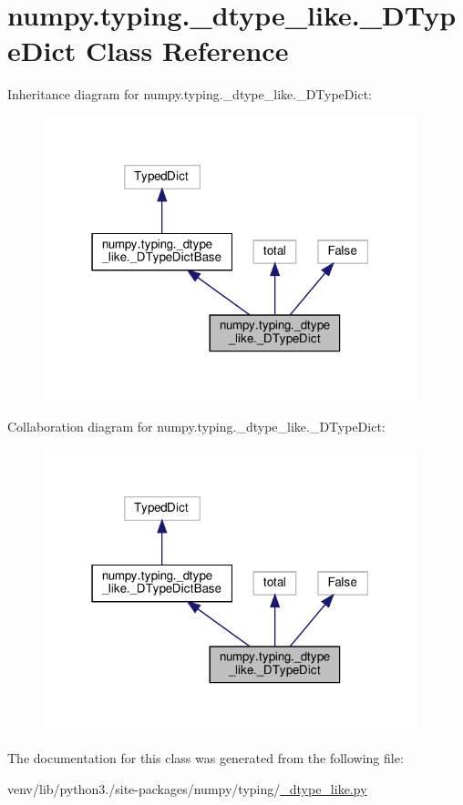 \hypertarget{classnumpy_1_1typing_1_1__dtype__like_1_1__DTypeDict}{}\section{numpy.\+typing.\+\_\+dtype\+\_\+like.\+\_\+\+D\+Type\+Dict Class Reference}
\label{classnumpy_1_1typing_1_1__dtype__like_1_1__DTypeDict}


Inheritance diagram for numpy.\+typing.\+\_\+dtype\+\_\+like.\+\_\+\+D\+Type\+Dict\+:
\nopagebreak
\begin{figure}[H]
\begin{center}
\leavevmode
\includegraphics[width=307pt]{classnumpy_1_1typing_1_1__dtype__like_1_1__DTypeDict__inherit__graph}
\end{center}
\end{figure}


Collaboration diagram for numpy.\+typing.\+\_\+dtype\+\_\+like.\+\_\+\+D\+Type\+Dict\+:
\nopagebreak
\begin{figure}[H]
\begin{center}
\leavevmode
\includegraphics[width=307pt]{classnumpy_1_1typing_1_1__dtype__like_1_1__DTypeDict__coll__graph}
\end{center}
\end{figure}


The documentation for this class was generated from the following file\+:\begin{DoxyCompactItemize}
\item 
venv/lib/python3./site-\/packages/numpy/typing/\hyperlink{__dtype__like_8py}{\+\_\+dtype\+\_\+like.\+py}\end{DoxyCompactItemize}
